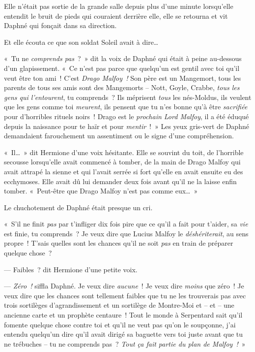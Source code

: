 Elle n'était pas sortie de la grande salle depuis plus d'une minute lorsqu'elle entendit le bruit de pieds qui couraient derrière elle, elle se retourna et vit Daphné qui fonçait dans sa direction.

Et elle écouta ce que son soldat Soleil avait à dire…

«~Tu ne \emph{comprends pas}~?~»
dit la voix de Daphné qui était à peine au-dessous d'un glapissement.
«~Ce n'est pas parce que quelqu'un est gentil avec toi qu'il veut être ton ami~!
C'est \emph{Drago Malfoy~!} Son père est un Mangemort, tous les parents de tous ses amis sont des Mangemorts -- Nott, Goyle, Crabbe, \emph{tous les gens qui l'entourent}, tu comprends~?
Ils méprisent \emph{tous} les nés-Moldus, ils veulent que les gens comme toi \emph{meurent}, ils pensent que tu n'es bonne qu'à être \emph{sacrifiée} pour d'horribles rituels noirs~!
Drago est le \emph{prochain Lord Malfoy}, il a été éduqué depuis la naissance pour te haïr et pour \emph{mentir}~!~»
Les yeux gris-vert de Daphné demandaient farouchement un assentiment ou le signe d'une compréhension.

«~Il…~» dit Hermione d'une voix hésitante.
Elle se souvint du toit, de l'horrible secousse lorsqu'elle avait commencé à tomber, de la main de Drago Malfoy qui avait attrapé la sienne et qui l'avait serrée si fort qu'elle en avait ensuite eu des ecchymoses.
Elle avait dû lui demander deux fois avant qu'il ne la laisse enfin tomber.
«~Peut-être que Drago Malfoy n'est pas comme eux…~»

Le chuchotement de Daphné était presque un cri.

«~S'il ne finit \emph{pas} par t'infliger dix fois pire que ce qu'il a fait pour t'aider, sa \emph{vie} est finie, tu comprends~?
Je veux dire que Lucius Malfoy le \emph{déshériterait}, au sens propre~!
T'sais quelles sont les chances qu'il ne soit \emph{pas} en train de préparer quelque chose~?

--- Faibles~? dit Hermione d'une petite voix.

--- \emph{Zéro~!} siffla Daphné.
Je veux dire \emph{aucune}~!
Je veux dire \emph{moins} que zéro~!
Je veux dire que les chances sont tellement faibles que tu ne les trouverais pas avec trois sortilèges d'agrandissement et un sortilège de Montre-Moi et -- et -- une ancienne carte et un prophète centaure~!
Tout le monde à Serpentard sait qu'il fomente quelque chose contre toi et qu'il ne veut pas qu'on le soupçonne, j'ai entendu quelqu'un dire qu'il avait dirigé sa baguette vers toi juste avant que tu ne trébuches -- tu ne comprends pas~?
\emph{Tout ça fait partie du plan de Malfoy~!}~»

